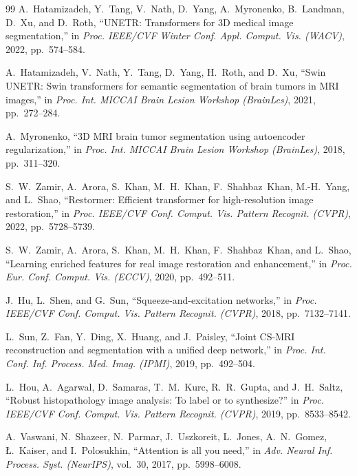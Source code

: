 \documentclass[conference]{IEEEtran}
\begin{document}
\begin{thebibliography}{99}
A.~Hatamizadeh, Y.~Tang, V.~Nath, D.~Yang, A.~Myronenko, B.~Landman,
D.~Xu, and D.~Roth,
``UNETR: Transformers for 3D medical image segmentation,''
in \textit{Proc. IEEE/CVF Winter Conf. Appl. Comput. Vis. (WACV)},
2022, pp.~574--584.

A.~Hatamizadeh, V.~Nath, Y.~Tang, D.~Yang, H.~Roth, and D.~Xu,
``Swin UNETR: Swin transformers for semantic segmentation of brain
tumors in MRI images,''
in \textit{Proc. Int. MICCAI Brain Lesion Workshop (BrainLes)},
2021, pp.~272--284.

A.~Myronenko,
``3D MRI brain tumor segmentation using autoencoder regularization,''
in \textit{Proc. Int. MICCAI Brain Lesion Workshop (BrainLes)},
2018, pp.~311--320.

S.~W.~Zamir, A.~Arora, S.~Khan, M.~H.~Khan, F.~Shahbaz~Khan,
M.-H.~Yang, and L.~Shao,
``Restormer: Efficient transformer for high-resolution image
restoration,''
in \textit{Proc. IEEE/CVF Conf. Comput. Vis. Pattern Recognit. (CVPR)},
2022, pp.~5728--5739.

S.~W.~Zamir, A.~Arora, S.~Khan, M.~H.~Khan, F.~Shahbaz~Khan,
and L.~Shao,
``Learning enriched features for real image restoration and
enhancement,''
in \textit{Proc. Eur. Conf. Comput. Vis. (ECCV)}, 2020,
pp.~492--511.

J.~Hu, L.~Shen, and G.~Sun,
``Squeeze-and-excitation networks,''
in \textit{Proc. IEEE/CVF Conf. Comput. Vis. Pattern Recognit. (CVPR)},
2018, pp.~7132--7141.

L.~Sun, Z.~Fan, Y.~Ding, X.~Huang, and J.~Paisley,
``Joint CS-MRI reconstruction and segmentation with a unified deep
network,''
in \textit{Proc. Int. Conf. Inf. Process. Med. Imag. (IPMI)},
2019, pp.~492--504.

L.~Hou, A.~Agarwal, D.~Samaras, T.~M.~Kurc, R.~R.~Gupta, and
J.~H.~Saltz,
``Robust histopathology image analysis: To label or to synthesize?''
in \textit{Proc. IEEE/CVF Conf. Comput. Vis. Pattern Recognit. (CVPR)},
2019, pp.~8533--8542.

A.~Vaswani, N.~Shazeer, N.~Parmar, J.~Uszkoreit, L.~Jones,
A.~N.~Gomez, {\L}.~Kaiser, and I.~Polosukhin,
``Attention is all you need,''
in \textit{Adv. Neural Inf. Process. Syst. (NeurIPS)}, vol.~30,
2017, pp.~5998--6008.

\end{thebibliography}
\end{document}
